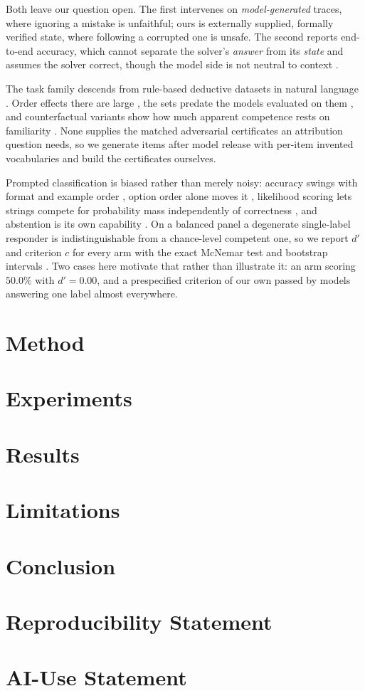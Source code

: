 \documentclass{article}
\begin{document}
Both leave our question open. The first intervenes on \emph{model-generated}
traces, where ignoring a mistake is unfaithful; ours is externally supplied,
formally verified state, where following a corrupted one is unsafe. The second
reports end-to-end accuracy, which cannot separate the solver's \emph{answer}
from its \emph{state} and assumes the solver correct, though the model side is
not neutral to context \citep{shi2023large,xie2023adaptive}.

The task family descends from rule-based deductive datasets in natural language
\citep{clark2020transformers,tafjord2020proofwriter,saparov2022language,han2022folio}.
Order effects there are large \citep{chen2024premise}, the sets predate the
models evaluated on them \citep{deng2024investigating,golchin2023time}, and
counterfactual variants show how much apparent competence rests on familiarity
\citep{wu2023reasoning}. None supplies the matched adversarial certificates an
attribution question needs, so we generate items after model release with
per-item invented vocabularies and build the certificates ourselves.

Prompted classification is biased rather than merely noisy: accuracy swings with
format and example order \citep{zhao2021calibrate}, option order alone moves it
\citep{pezeshkpour2023large,zheng2023large}, likelihood scoring lets strings
compete for probability mass independently of correctness
\citep{holtzman2021surface}, and abstention is its own capability
\citep{kadavath2022language,yin2023large}. On a balanced panel a degenerate
single-label responder is indistinguishable from a chance-level competent one,
so we report $d'$ and criterion $c$ for every arm
\citep{macmillan1991detection,stanislaw1999calculation} with the exact McNemar
test \citep{mcnemar1947note} and bootstrap intervals \citep{efron1987better}.
Two cases here motivate that rather than illustrate it: an arm scoring $50.0\%$
with $d' = 0.00$, and a prespecified criterion of our own passed by models
answering one label almost everywhere.

\section{Method}
\section{Experiments}
\section{Results}
\section{Limitations}
\section{Conclusion}

\section*{Reproducibility Statement}

\section*{AI-Use Statement}



\end{document}
